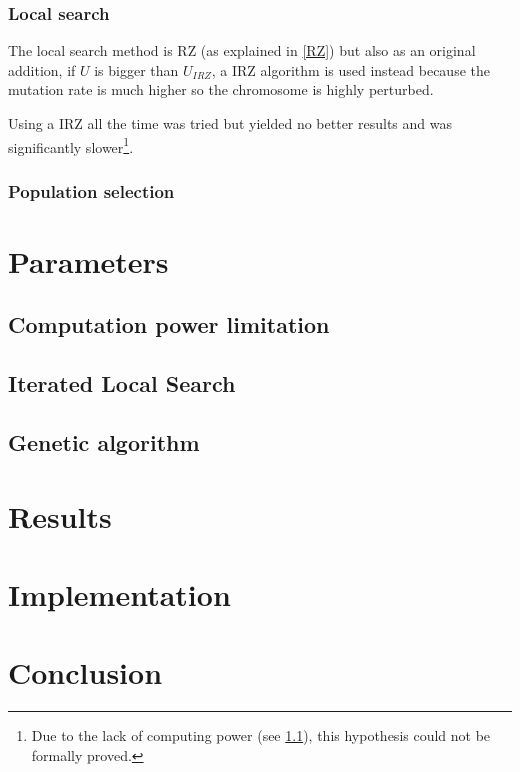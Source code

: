 \documentclass[a4paper]{article}
\begin{document}
\subsubsection{Local search}

The local search method is RZ (as explained in \ref{RZ}) but also as an original addition, if $U$ is bigger than $U_{IRZ}$, a IRZ algorithm is used instead because the mutation rate is much higher so the chromosome is highly perturbed.

Using a IRZ all the time was tried but yielded no better results and was significantly slower\footnote{Due to the lack of computing power (see \ref{power}), this hypothesis could not be formally proved.}.

\subsubsection{Population selection}



\section{Parameters}
\subsection{Computation power limitation}
\label{power}
\subsection{Iterated Local Search}
\subsection{Genetic algorithm}

\section{Results}


\section{Implementation}

\section{Conclusion}



\end{document}
